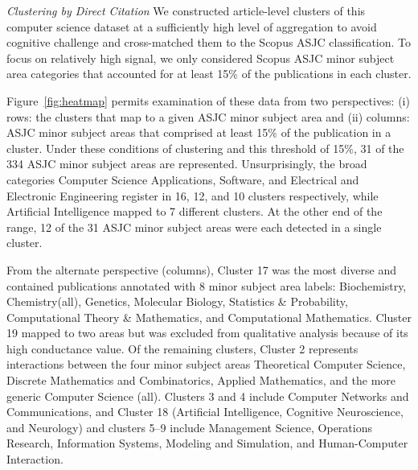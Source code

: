 \emph{Clustering by Direct Citation} We constructed article-level clusters of this computer science dataset at a sufficiently high level of aggregation to avoid cognitive challenge and cross-matched them to the Scopus ASJC classification. To focus on relatively high signal, we only considered Scopus ASJC minor subject area categories that accounted for at least 15\% of the publications in each cluster. 

Figure~\ref{fig:heatmap} permits examination of these data from two perspectives: (i) rows: the clusters that map to a given ASJC minor subject area and (ii) columns: ASJC minor subject areas that comprised at least 15\% of the publication in a cluster. Under these conditions of clustering and this threshold of 15\%, 31 of the 334 ASJC minor subject areas are represented. Unsurprisingly, the broad categories Computer Science Applications, Software, and Electrical and Electronic Engineering register in 16, 12, and 10 clusters respectively, while Artificial Intelligence mapped to 7 different clusters. At the other end of the range, 12 of the 31 ASJC minor subject areas were each detected in a single cluster. 

From the alternate perspective (columns), Cluster 17 was the most diverse and contained publications annotated with 8 minor subject area labels: Biochemistry, Chemistry(all), Genetics, Molecular Biology,  Statistics \& Probability, Computational Theory \& Mathematics, and Computational Mathematics. Cluster 19 mapped to two areas but was excluded from qualitative analysis because of its high conductance value. 
Of the remaining clusters, Cluster 2 represents interactions between the four minor subject areas Theoretical Computer Science, Discrete Mathematics and Combinatorics, Applied Mathematics,  and the more generic Computer Science (all). Clusters 3 and 4 include Computer Networks and Communications, and Cluster 18 (Artificial Intelligence, Cognitive Neuroscience, and Neurology) and clusters 5--9 include Management Science, Operations Research, Information Systems, Modeling and Simulation, and Human-Computer Interaction.

